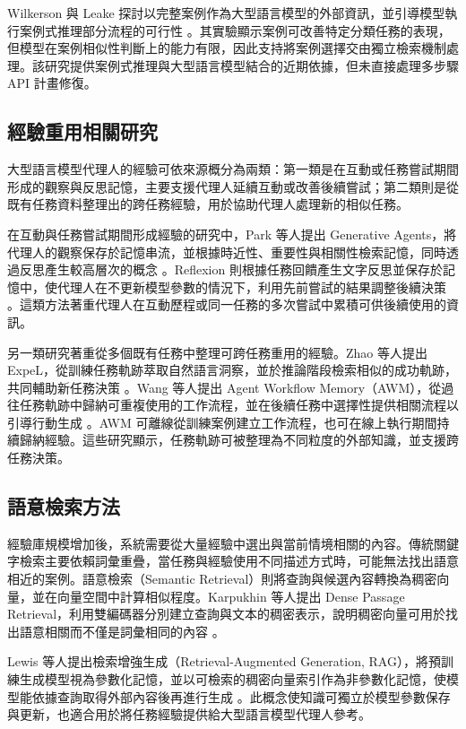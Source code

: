 Wilkerson 與 Leake 探討以完整案例作為大型語言模型的外部資訊，並引導模型執行案例式推理部分流程的可行性 \cite{wilkerson2024implementingcbr}。其實驗顯示案例可改善特定分類任務的表現，但模型在案例相似性判斷上的能力有限，因此支持將案例選擇交由獨立檢索機制處理。該研究提供案例式推理與大型語言模型結合的近期依據，但未直接處理多步驟 API 計畫修復。

\subsection{經驗重用相關研究}

大型語言模型代理人的經驗可依來源概分為兩類：第一類是在互動或任務嘗試期間形成的觀察與反思記憶，主要支援代理人延續互動或改善後續嘗試；第二類則是從既有任務資料整理出的跨任務經驗，用於協助代理人處理新的相似任務。

在互動與任務嘗試期間形成經驗的研究中，Park 等人提出 Generative Agents，將代理人的觀察保存於記憶串流，並根據時近性、重要性與相關性檢索記憶，同時透過反思產生較高層次的概念 \cite{park2023generative}。Reflexion 則根據任務回饋產生文字反思並保存於記憶中，使代理人在不更新模型參數的情況下，利用先前嘗試的結果調整後續決策 \cite{shinn2023reflexion}。這類方法著重代理人在互動歷程或同一任務的多次嘗試中累積可供後續使用的資訊。

另一類研究著重從多個既有任務中整理可跨任務重用的經驗。Zhao 等人提出 ExpeL，從訓練任務軌跡萃取自然語言洞察，並於推論階段檢索相似的成功軌跡，共同輔助新任務決策 \cite{zhao2024expel}。Wang 等人提出 Agent Workflow Memory（AWM），從過往任務軌跡中歸納可重複使用的工作流程，並在後續任務中選擇性提供相關流程以引導行動生成 \cite{wang2025awm}。AWM 可離線從訓練案例建立工作流程，也可在線上執行期間持續歸納經驗。這些研究顯示，任務軌跡可被整理為不同粒度的外部知識，並支援跨任務決策。

\subsection{語意檢索方法}

經驗庫規模增加後，系統需要從大量經驗中選出與當前情境相關的內容。傳統關鍵字檢索主要依賴詞彙重疊，當任務與經驗使用不同描述方式時，可能無法找出語意相近的案例。語意檢索（Semantic Retrieval）則將查詢與候選內容轉換為稠密向量，並在向量空間中計算相似程度。Karpukhin 等人提出 Dense Passage Retrieval，利用雙編碼器分別建立查詢與文本的稠密表示，說明稠密向量可用於找出語意相關而不僅是詞彙相同的內容 \cite{karpukhin2020dpr}。

Lewis 等人提出檢索增強生成（Retrieval-Augmented Generation, RAG），將預訓練生成模型視為參數化記憶，並以可檢索的稠密向量索引作為非參數化記憶，使模型能依據查詢取得外部內容後再進行生成 \cite{lewis2020rag}。此概念使知識可獨立於模型參數保存與更新，也適合用於將任務經驗提供給大型語言模型代理人參考。

